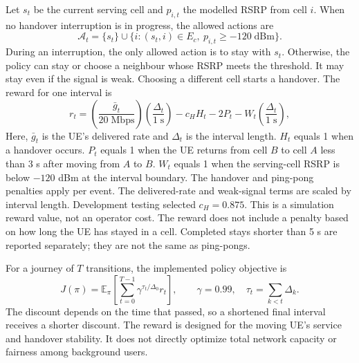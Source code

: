 \documentclass[fleqn,10pt,twoside]{IOEGC}
\begin{document}
Let $s_t$ be the current serving cell and $p_{i,t}$ the modelled RSRP from cell $i$. When no handover interruption is in progress, the allowed actions are
\begin{equation}
  \mathcal{A}_t=\{s_t\}\cup\{i:(s_t,i)\in E_c,\ p_{i,t}\geq-120\;\mathrm{dBm}\}.
  \label{eq:actions}
\end{equation}
During an interruption, the only allowed action is to stay with $s_t$. Otherwise, the policy can stay or choose a neighbour whose RSRP meets the threshold. It may stay even if the signal is weak. Choosing a different cell starts a handover. The reward for one interval is
\begin{equation}
 r_t=\left(\frac{\bar g_t}{20\;\mathrm{Mbps}}\right)\left(\frac{\Delta_t}{1\;\mathrm{s}}\right)-c_HH_t-2P_t-W_t\left(\frac{\Delta_t}{1\;\mathrm{s}}\right),
 \label{eq:reward}
\end{equation}
Here, $\bar g_t$ is the UE's delivered rate and $\Delta_t$ is the interval length. $H_t$ equals 1 when a handover occurs. $P_t$ equals 1 when the UE returns from cell $B$ to cell $A$ less than 3 s after moving from $A$ to $B$. $W_t$ equals 1 when the serving-cell RSRP is below $-120$ dBm at the interval boundary. The handover and ping-pong penalties apply per event. The delivered-rate and weak-signal terms are scaled by interval length. Development testing selected $c_H=0.875$. This is a simulation reward value, not an operator cost. The reward does not include a penalty based on how long the UE has stayed in a cell. Completed stays shorter than 5 s are reported separately; they are not the same as ping-pongs.

For a journey of $T$ transitions, the implemented policy objective is
\begin{equation}
  J(\pi)=\mathbb{E}_{\pi}\left[\sum_{t=0}^{T-1}\gamma^{\tau_t/\Delta_0}r_t\right],\qquad
  \gamma=0.99,\quad \tau_t=\sum_{k<t}\Delta_k.
  \label{eq:objective}
\end{equation}
The discount depends on the time that passed, so a shortened final interval receives a shorter discount. The reward is designed for the moving UE's service and handover stability. It does not directly optimize total network capacity or fairness among background users.
\end{document}
